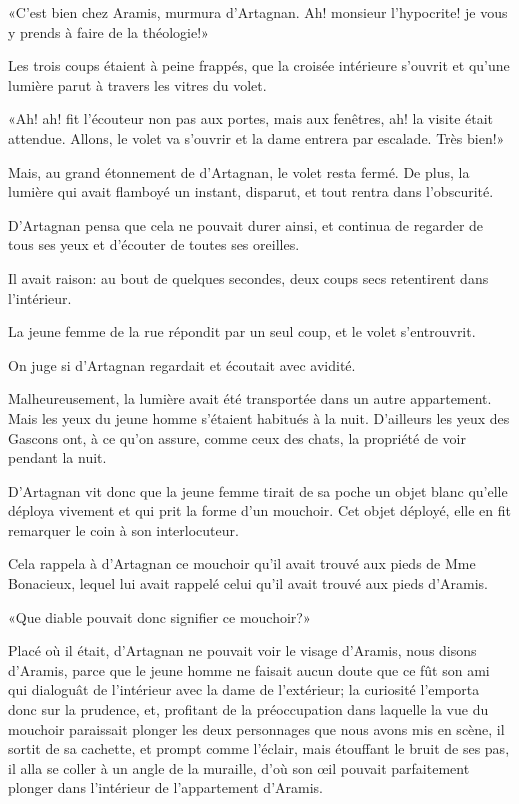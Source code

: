 «C'est bien chez Aramis, murmura d'Artagnan. Ah! monsieur l'hypocrite! je vous y prends à faire de la théologie!» 

Les trois coups étaient à peine frappés, que la croisée intérieure s'ouvrit et qu'une lumière parut à travers les vitres du volet. 

«Ah! ah! fit l'écouteur non pas aux portes, mais aux fenêtres, ah! la visite était attendue. Allons, le volet va s'ouvrir et la dame entrera par escalade. Très bien!» 

Mais, au grand étonnement de d'Artagnan, le volet resta fermé. De plus, la lumière qui avait flamboyé un instant, disparut, et tout rentra dans l'obscurité. 

D'Artagnan pensa que cela ne pouvait durer ainsi, et continua de regarder de tous ses yeux et d'écouter de toutes ses oreilles. 

Il avait raison: au bout de quelques secondes, deux coups secs retentirent dans l'intérieur. 

La jeune femme de la rue répondit par un seul coup, et le volet s'entrouvrit. 

On juge si d'Artagnan regardait et écoutait avec avidité. 

Malheureusement, la lumière avait été transportée dans un autre appartement. Mais les yeux du jeune homme s'étaient habitués à la nuit. D'ailleurs les yeux des Gascons ont, à ce qu'on assure, comme ceux des chats, la propriété de voir pendant la nuit. 

D'Artagnan vit donc que la jeune femme tirait de sa poche un objet blanc qu'elle déploya vivement et qui prit la forme d'un mouchoir. Cet objet déployé, elle en fit remarquer le coin à son interlocuteur. 

Cela rappela à d'Artagnan ce mouchoir qu'il avait trouvé aux pieds de Mme Bonacieux, lequel lui avait rappelé celui qu'il avait trouvé aux pieds d'Aramis. 

«Que diable pouvait donc signifier ce mouchoir?» 

Placé où il était, d'Artagnan ne pouvait voir le visage d'Aramis, nous disons d'Aramis, parce que le jeune homme ne faisait aucun doute que ce fût son ami qui dialoguât de l'intérieur avec la dame de l'extérieur; la curiosité l'emporta donc sur la prudence, et, profitant de la préoccupation dans laquelle la vue du mouchoir paraissait plonger les deux personnages que nous avons mis en scène, il sortit de sa cachette, et prompt comme l'éclair, mais étouffant le bruit de ses pas, il alla se coller à un angle de la muraille, d'où son œil pouvait parfaitement plonger dans l'intérieur de l'appartement d'Aramis. 

